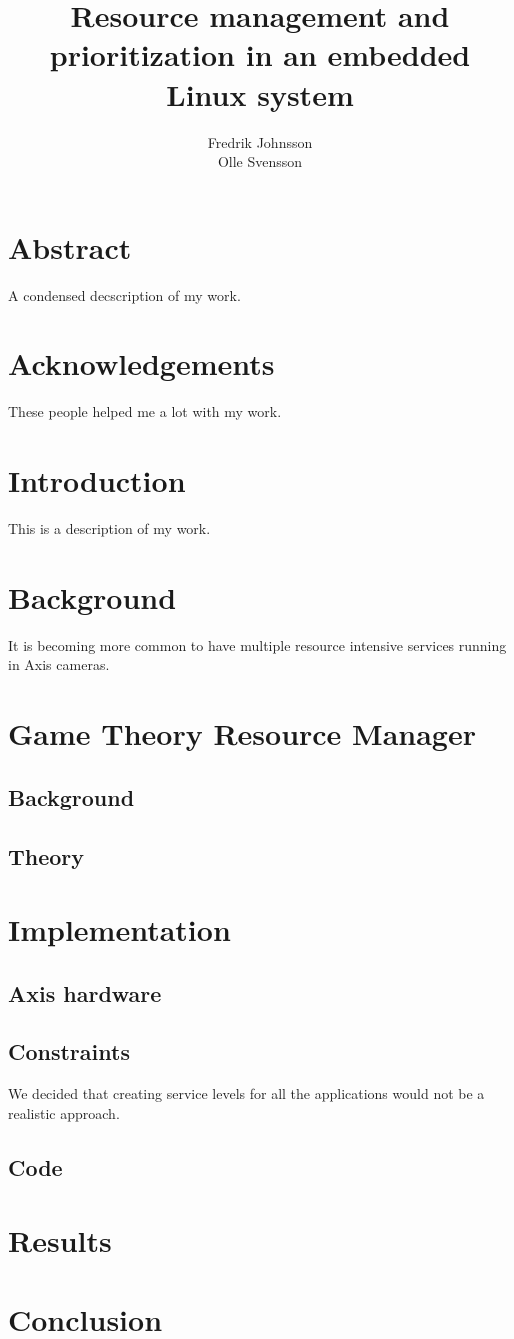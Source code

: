 \documentclass{LTHthesis}
\begin{document}
\begin{titlepages}
\author{Fredrik Johnsson\\Olle Svensson}
\title{Resource management and prioritization in an embedded Linux system}
\end{titlepages}
\setcounter{page}{1}
\chapter*{Abstract}
A condensed decscription of my work.
\chapter*{Acknowledgements}
These people helped me a lot with my work.
\newpage
\tableofcontents
\newpage
\setcounter{page}{1}
\chapter{Introduction}
This is a description of my work.
\chapter{Background}
It is becoming more common to have multiple resource intensive services running in Axis cameras.
\chapter{Game Theory Resource Manager}
\section{Background} %
\section{Theory} %
\chapter{Implementation}
\section{Axis hardware} %
\section{Constraints} %
We decided that creating service levels for all the applications would not be a realistic approach.
\section{Code} 
\chapter{Results}
\chapter{Conclusion}
\printbibliography  %
\end{document}
